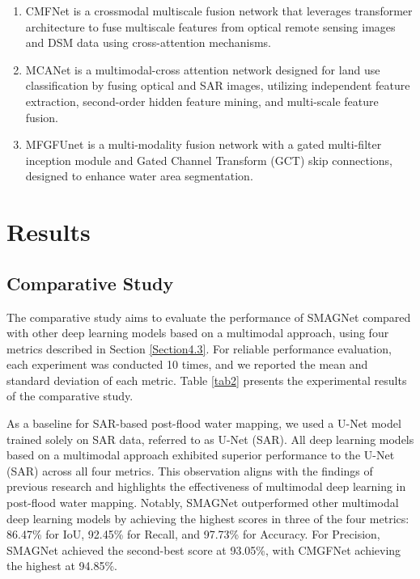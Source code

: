 \documentclass[preprint,12pt,authoryear]{elsarticle}
\begin{document}
\begin{enumerate}
    \item CMFNet \citep{ma2022crossmodal} is a crossmodal multiscale fusion network that leverages transformer architecture to fuse multiscale features from optical remote sensing images and DSM data using cross-attention mechanisms.
    \item MCANet \citep{li2022mcanet} is a multimodal-cross attention network designed for land use classification by fusing optical and SAR images, utilizing independent feature extraction, second-order hidden feature mining, and multi-scale feature fusion.
    \item MFGFUnet \citep{wang2024multi} is a multi-modality fusion network with a gated multi-filter inception module and Gated Channel Transform (GCT) \citep{yang2020gated} skip connections, designed to enhance water area segmentation.
    
\end{enumerate}

\section{Results}
\label{Section5}

\subsection{Comparative Study}
\label{Section5.1}

The comparative study aims to evaluate the performance of SMAGNet compared with other deep learning models based on a multimodal approach, using four metrics described in Section \ref{Section4.3}. For reliable performance evaluation, each experiment was conducted 10 times, and we reported the mean and standard deviation of each metric. Table \ref{tab2} presents the experimental results of the comparative study. 

As a baseline for SAR-based post-flood water mapping, we used a U-Net model trained solely on SAR data, referred to as U-Net (SAR). All deep learning models based on a multimodal approach exhibited superior performance to the U-Net (SAR) across all four metrics. This observation aligns with the findings of previous research \citep{konapala2021exploring} and highlights the effectiveness of multimodal deep learning in post-flood water mapping. Notably, SMAGNet outperformed other multimodal deep learning models by achieving the highest scores in three of the four metrics: 86.47\% for IoU, 92.45\% for Recall, and 97.73\% for Accuracy. For Precision, SMAGNet achieved the second-best score at 93.05\%, with CMGFNet achieving the highest at 94.85\%.
\end{document}
